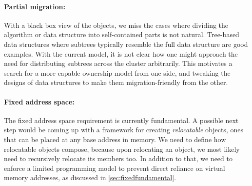 % 


\paragraph{Partial migration:}
With a black box view of the objects, we miss the cases where dividing the
algorithm or data structure into self-contained parts is not natural.
Tree-based data structures where subtrees typically resemble the full data
structure are good examples. With the current model, it is not
clear how one might approach the need for distributing subtrees across the
cluster arbitrarily. This motivates a search for a more capable ownership model
from one side, and tweaking the designs of data structures to make them
migration-friendly from the other.

\paragraph{Fixed address space:}
The fixed address space requirement is currently fundamental. A possible next
step would be coming up with a framework for creating \emph{relocatable}
objects, ones that can be placed at any base address in memory. We need
to define how relocatable objects compose, because upon relocating an object,
we most likely need to recursively relocate its members too. In addition to
that, we need to enforce a limited programming model to prevent direct reliance
on virtual memory addresses, as discussed in \autoref{sec:fixedfundamental}.

